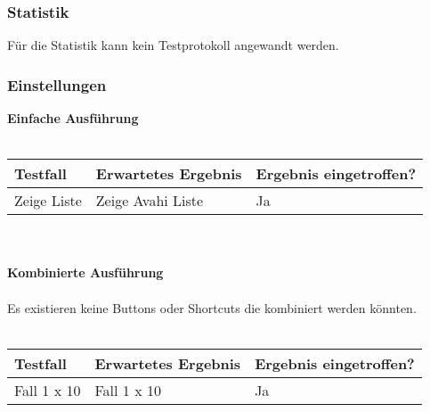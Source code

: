 \subsubsection{Statistik}
Für die Statistik kann kein Testprotokoll angewandt werden.
\subsubsection{Einstellungen}
\textbf{Einfache Ausführung}\ \\ \\
\begin{tabularx}{\textwidth}{|X|X|l|}
    \hline
    \textbf{Testfall} & \textbf{Erwartetes Ergebnis} & \textbf{Ergebnis eingetroffen?}\\
    \hline
    Zeige Liste & Zeige Avahi Liste & Ja\\
    \hline
\end{tabularx}
\ \\ \\
\textbf{Kombinierte Ausführung}\ \\ \\

Es existieren keine Buttons oder Shortcuts die kombiniert werden könnten.\ \\ \\

\begin{tabularx}{\textwidth}{|X|X|l|}
    \hline
    \textbf{Testfall} & \textbf{Erwartetes Ergebnis} & \textbf{Ergebnis eingetroffen?}\\
    \hline
    Fall 1 x 10 & Fall 1 x 10 & Ja\\
    \hline
\end{tabularx}
